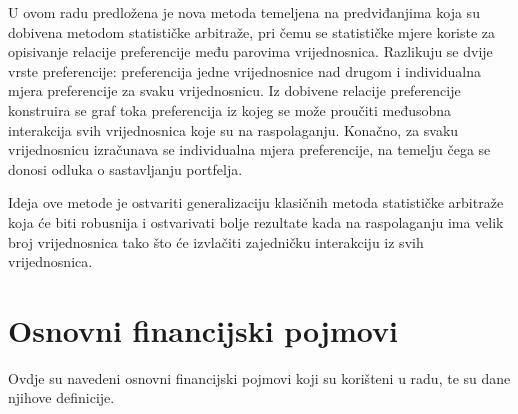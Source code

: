 \documentclass[lmodern, utf8, diplomski, numeric]{fer}
\begin{document}
  U ovom radu predložena je nova metoda temeljena na predviđanjima koja su dobivena metodom statističke arbitraže, pri čemu se statističke mjere koriste za opisivanje relacije preferencije među parovima vrijednosnica.
  Razlikuju se dvije vrste preferencije: preferencija jedne vrijednosnice nad drugom i individualna mjera preferencije za svaku vrijednosnicu.
  Iz dobivene relacije preferencije konstruira se graf toka preferencija iz kojeg se može proučiti međusobna interakcija svih vrijednosnica koje su na raspolaganju.
  Konačno, za svaku vrijednosnicu izračunava se individualna mjera preferencije, na temelju čega se donosi odluka o sastavljanju portfelja.
  
  Ideja ove metode je ostvariti generalizaciju klasičnih metoda statističke arbitraže koja će biti robusnija i ostvarivati bolje rezultate kada na raspolaganju ima velik broj vrijednosnica tako što će izvlačiti zajedničku interakciju iz svih vrijednosnica.
  

  \chapter{Osnovni financijski pojmovi}
  Ovdje su navedeni osnovni financijski pojmovi koji su korišteni u radu, te su dane njihove definicije.
  
\end{document}
